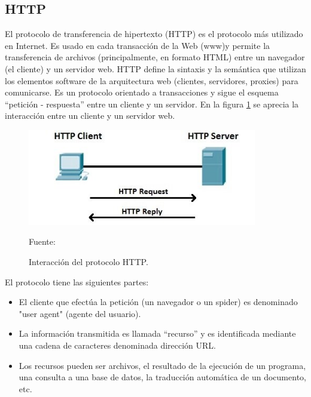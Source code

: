 \subsection{HTTP}
El protocolo de transferencia de hipertexto (HTTP) es el protocolo más utilizado en Internet. Es usado en cada transacción de la Web (www)y permite la transferencia de archivos (principalmente, en formato HTML) entre un navegador (el cliente) y un servidor web. HTTP define la sintaxis y la semántica que utilizan los elementos software de la arquitectura web (clientes, servidores, proxies) para comunicarse. Es un protocolo orientado a transacciones y sigue el esquema ``petición - respuesta'' entre un cliente y un servidor. En la figura \ref{fig:http} se aprecia la interacción entre un cliente y un servidor web.

\begin{figure}[H]
    \begin{center}
        \includegraphics[width=10cm]{img/capitulo_2/http1.jpg}
        \caption{Interacción del protocolo HTTP.\\}
        Fuente: \cite{http}
        \label{fig:http}
    \end{center}
\end{figure}

El protocolo tiene las siguientes partes:
\begin{itemize}
    \item El cliente que efectúa la petición (un navegador o un spider) es denominado "user agent" (agente del usuario). 
    \item La información transmitida es llamada ``recurso'' y es identificada mediante una cadena de caracteres denominada dirección URL.
    \item Los recursos pueden ser archivos, el resultado de la ejecución de un programa, una consulta a una base de datos, la traducción automática de un documento, etc.
\end{itemize}

